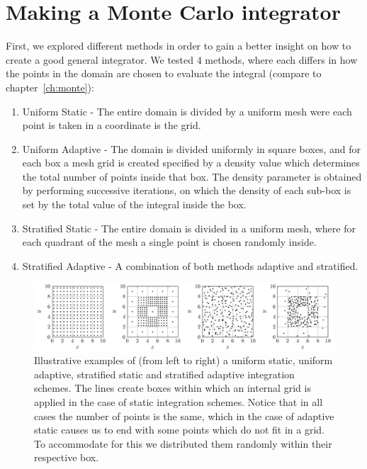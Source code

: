 \section{Making a Monte Carlo integrator}
\label{ch:monte_app}

First, we explored different methods in order to gain a better insight on how to create a good general integrator. We tested 4 methods, where each differs in how the points in the domain are chosen to evaluate the integral (compare to chapter~\ref{ch:monte}):
\begin{enumerate}
  \item Uniform Static - The entire domain is divided by a uniform mesh were each point is taken in a coordinate is the grid.
  \item Uniform Adaptive - The domain is divided uniformly in square boxes, and for each box a mesh grid is created
  specified by a density value which determines the total number of points inside that box. The density parameter
  is obtained by performing successive iterations, on which the density of each sub-box is set by the total value of the integral inside
  the box.
  \item Stratified Static - The entire domain is divided in a uniform mesh, where for each quadrant of the mesh
  a single point is chosen randomly inside.
  \item Stratified Adaptive - A combination of both methods adaptive and stratified.
\end{enumerate}
\begin{figure}
  \begin{center}
    \includegraphics[scale=0.9]{graphs/BoxPlotter.pdf}
	\caption{
	  	Illustrative examples of (from left to right) a uniform static, uniform adaptive, stratified static and stratified adaptive integration schemes. The lines create boxes within which an internal grid is applied in the case of static integration schemes. Notice that in all cases the number of points is the same, which in the case of adaptive static causes us to end with some points which do not fit in a grid. To accommodate for this we distributed them randomly within their respective box.
  	}
	\label{fig:BoxPlotter}
  \end{center}
\end{figure}

